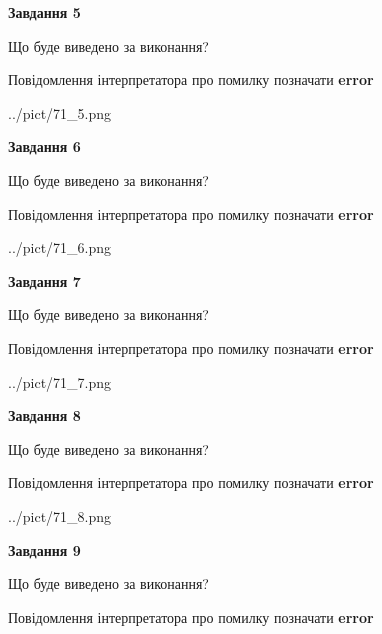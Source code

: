 \documentclass[11pt, ukrainian]{article}
\begin{document}
{\begin {large}
{\begin {center}\textbf{Завдання 5}\end {center}}\par
Що буде виведено за виконання? \par
Повідомлення інтерпретатора про помилку позначати \textbf{error}

\begin{center}
	{../pict/71_5.png}
\end{center}
\newpage

{\begin {center}\textbf{Завдання 6}\end {center}}\par
Що буде виведено за виконання? \par
Повідомлення інтерпретатора про помилку позначати \textbf{error}

\begin{center}
	{../pict/71_6.png}
\end{center}
\newpage

{\begin {center}\textbf{Завдання 7}\end {center}}\par
Що буде виведено за виконання? \par
Повідомлення інтерпретатора про помилку позначати \textbf{error}

\begin{center}
	{../pict/71_7.png}
\end{center}
\newpage

{\begin {center}\textbf{Завдання 8}\end {center}}\par
Що буде виведено за виконання? \par
Повідомлення інтерпретатора про помилку позначати \textbf{error}

\begin{center}
	{../pict/71_8.png}
\end{center}
\newpage

{\begin {center}\textbf{Завдання 9}\end {center}}\par
Що буде виведено за виконання? \par
Повідомлення інтерпретатора про помилку позначати \textbf{error}


\end{large}}
\end{document}
